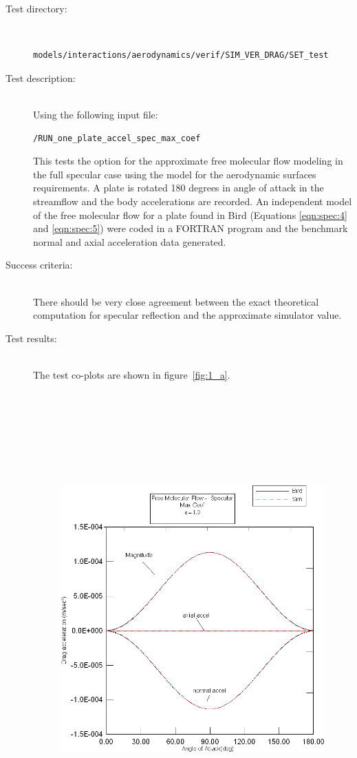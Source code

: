 \label{test:amfs}
\begin{description}
\item[Test directory:] \
\begin{verbatim}models/interactions/aerodynamics/verif/SIM_VER_DRAG/SET_test\end{verbatim}
\item[Test description:] \ \\
Using the following input file:
\begin{verbatim}/RUN_one_plate_accel_spec_max_coef\end{verbatim}
This tests the option for the approximate free
molecular flow modeling in the full specular case using the model for the
aerodynamic surfaces requirements.  A plate is
rotated 180 degrees in angle of attack in the streamflow and the
body accelerations are recorded. An independent model of the free
molecular flow for a plate found in Bird \cite{Bird} (Equations \ref{eqn:spec:4} and
\ref{eqn:spec:5})
were coded in a FORTRAN program and the benchmark normal and axial
acceleration data generated.
\item[Success criteria:] \ \\
There should be very close agreement between the exact theoretical
computation for specular reflection and the approximate simulator
value.
\item[Test results:] \ \\
The test co-plots are shown in figure~\ref{fig:1_a}.
\begin{figure}[hbpt]
\includegraphics [height=175mm]{figs/specular_max.jpg}

\end{figure}
\end{description}
